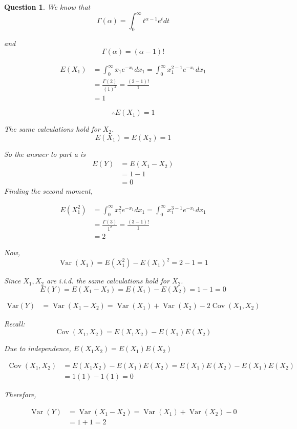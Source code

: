 \documentclass{article}
\theoremstyle{questionstyle}
\newtheorem{myquestion}{Question}
\begin{document}
\begin{myquestion}
We know that \[\Gamma(\alpha) = \int_{0}^{\infty} t^{\alpha-1} e^t dt\] 

and \[\Gamma(\alpha) = (\alpha -1)!\]

\begin{align*}
    E(X_1) &= \int_{0}^{\infty} x_1 e^{-x_1} dx_1 = \int_{0}^{\infty} x_1^{2-1} e^{-x_1} dx_1\\
    &= \frac{\Gamma(2)}{(1)^2} = \frac{(2-1)!}{1}\\ 
    &= 1
\end{align*}

\[\therefore E(X_1) = 1\]

The same calculations hold for $X_2$. \[E(X_1) = E(X_2) = 1\]

So the answer to part \textit{a} is 
\begin{align*}
    E(Y) &= E(X_1 - X_2)\\ &= 1 - 1\\ &= 0
\end{align*}
Finding the second moment, 

\begin{align*}
    E(X_1^2) &= \int_{0}^{\infty} x_1^2 e^{-x_1} dx_1 = \int_{0}^{\infty} x_1^{3-1} e^{-x_1} dx_1\\
    &= \frac{\Gamma(3)}{1^2} = \frac{(3-1)!}{1} \\
    &= 2
\end{align*}

Now, \[\operatorname{Var}(X_1) = E(X_1^2) - E(X_1)^2 = 2-1 = 1\]

Since \(X_1, X_2\) are i.i.d. the same calculations hold for $X_2$.\\

\[E(Y)=E(X_1-X_2) = E(X_1) - E(X_2) = 1-1 = 0\]

\begin{align*}
    \text{Var}(Y) &= \operatorname{Var}(X_1-X_2) = \operatorname{Var}(X_1) + \operatorname{Var}(X_2) - 2\operatorname{Cov}(X_1, X_2)
\end{align*}

Recall: 
\[\operatorname{Cov}(X_1, X_2) = E(X_1X_2) - E(X_1)E(X_2)\]

Due to independence, \(E(X_1X_2) = E(X_1)E(X_2)\)

\begin{align*}
    \operatorname{Cov}(X_1, X_2) &= E(X_1X_2) - E(X_1)E(X_2) = E(X_1)E(X_2) - E(X_1)E(X_2)\\
    &= 1(1) - 1(1) = 0
\end{align*}

Therefore, 

\begin{align*}
    \operatorname{Var}(Y) &= \operatorname{Var}(X_1-X_2) = \operatorname{Var}(X_1) + \operatorname{Var}(X_2) - 0\\
    &= 1+1 = 2
\end{align*}
\end{myquestion} %
\end{document}
